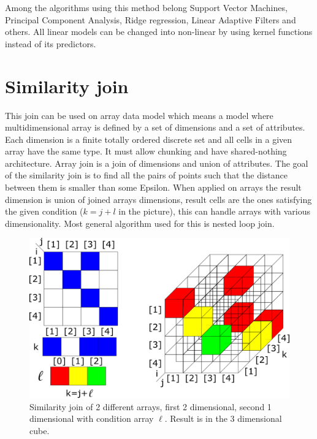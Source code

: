 Among the algorithms using this method belong Support Vector Machines, Principal Component Analysis, Ridge regression, Linear Adaptive Filters and others. All linear models can be changed into non-linear by using kernel functions instead of its predictors. \cite{kernel} \cite{machineLearning}





\section{Similarity join}
This join can be used on array data model which means a model where multidimensional array is defined by a set of dimensions and a set of attributes. Each dimension is a finite totally ordered discrete set and all cells in a given array have the same type. It must allow chunking and have shared-nothing architecture. Array join is a join of dimensions and union of attributes. The goal of the similarity join is to find all the pairs of points such that the distance between them is smaller than some Epsilon.
When applied on arrays the result dimension is union of joined arrays dimensions, result cells are the ones satisfying the given condition ($k=j+l$ in the picture), this can handle arrays with various dimensionality. Most general algorithm used for this is nested loop join. \cite{simJoin}
\begin{figure}
\centering
\includegraphics[scale=0.4]{simjoin.png}
\caption{Similarity join of 2 different arrays, first 2 dimensional, second 1 dimensional with condition array $\ell$. Result is in the 3 dimensional cube.}
\end{figure}


